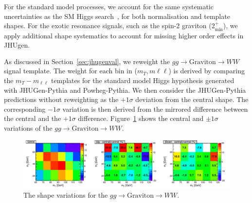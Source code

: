 For the standard model processes, we account for the same systematic
uncertainties as the SM Higgs search~\cite{HWWHCP2012},
for both normalisation and template shapes.
For the exotic resonance signals, such as the spin-2 
graviton ($2_\text{min}^+$), we apply additional 
shape systematics to account for missing higher order effects in JHUgen. 

As discussed in Section~\ref{sec:jhugenval}, we reweight the $gg\to \text{Graviton}\to WW$
signal template.
The weight for each bin in ($m_T, m{\ell\ell}$) is derived by comparing
the $m_T-m_{\ell\ell}$ templates for the standard model Higgs hypothesis
generated with JHUGen-Pythia and Powheg-Pythia.
We then consider the JHUGen-Pythia 
predictions without reweighting as the $+1\sigma$ deviation from the central shape.
The corresponding $-1\sigma$ variation is then derived from the mirrored difference between 
the central and the $+1\sigma$ difference. 
Figure~\ref{fig:xwwshapevar} shows the central and $\pm1\sigma$ variations 
of the $gg\to \text{Graviton}\to WW$. 

\vspace{20pt}


\begin{figure}[!hbtp]
\centering
\label{subfig:xwwshapevar}
\includegraphics[width=1.05\textwidth]{figures/xww_ggHshapevar.pdf}
\caption{The shape variations for the $gg\to \text{Graviton}\to WW$. 
}
\label{fig:xwwshapevar}
\end{figure}
